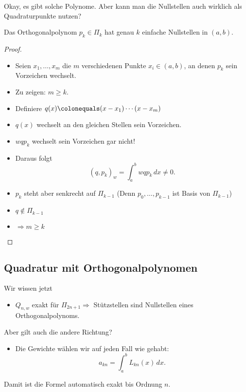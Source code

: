 \bigskip

Okay, es gibt solche Polynome. Aber kann man die Nullstellen auch wirklich als Quadraturpunkte nutzen?

\begin{satz}
Das Orthogonalpolynom $p_k \in \Pi_k$ hat genau $k$ einfache Nullstellen in $(a,b)$.
\end{satz}
\begin{proof}\mbox{}
\begin{itemize}
\item Seien $x_1, \dots, x_m$ die $m$ verschiedenen Punkte $x_i \in (a,b)$, an denen $p_k$ sein Vorzeichen wechselt.
\item Zu zeigen: $m \ge k$.
\item Definiere $q(x) \colonequals (x-x_1) \cdots (x-x_m)$
\item $q(x)$ wechselt an den gleichen Stellen sein Vorzeichen.
\item $wqp_k$ wechselt sein Vorzeichen gar nicht!
\item Daraus folgt
 \begin{equation*}
  (q,p_k)_w = \int_a^b wqp_k \,dx \neq 0.
 \end{equation*}
\item $p_k$ steht aber senkrecht auf $\Pi_{k-1}$ (Denn $p_0, \dots, p_{k-1}$ ist Basis von $\Pi_{k-1}$)
\item $q \not\in \Pi_{k-1}$
\item $\Rightarrow m \ge k$ \qedhere
\end{itemize}
\end{proof}


\subsection{Quadratur mit Orthogonalpolynomen}

Wir wissen jetzt
\begin{itemize}
\item $Q_{n,w}$ exakt für $\Pi_{2n +1} \Rightarrow$ Stützstellen sind Nullstellen eines Orthogonalpolynoms.
\end{itemize}

\medskip

Aber gilt auch die andere Richtung?
\begin{itemize}
\item Die Gewichte wählen wir auf jeden Fall wie gehabt:
\begin{equation*}
a_{kn} = \int_a^b L_{kn}(x) \, dx.
\end{equation*}
\end{itemize}
Damit ist die Formel automatisch exakt bis Ordnung $n$.

